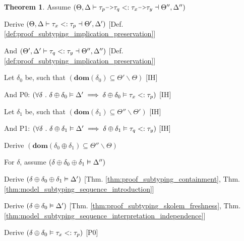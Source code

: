 \documentclass[acmsmall]{acmart}
\theoremstyle{definition}
\newtheorem{theorem}{Theorem}[section]
\begin{document}
\begin{theorem}

  \item \N Assume $(
    \Theta, \Delta \entails 
    \tau_{p} \J{->} \tau_{q} 
    \subtypes 
    \tau_{x} \J{->} \tau_{y}
    \given \Theta'', \Delta'' 
  )$

  \item \I \N Derive $(
    \Theta, \Delta \vdash \tau_{x} <: \tau_{p} \dashv \Theta', \Delta'
  )$ [Def. \ref{def:proof_subtyping_implication_preservation}]

  \item \I \N And $(
    \Theta', \Delta' \vdash \tau_{q} <: \tau_{y} \dashv \Theta'', \Delta'' 
  )$ [Def. \ref{def:proof_subtyping_implication_preservation}]

  \item \I \N Let $\delta_0$ be, such that $(
    \textbf{dom}(\delta_0) \subseteq \Theta' \backslash \Theta
  )$ [IH]
  \item \I \N And P0: $(
    \forall \delta \ .\  
    \delta \oplus \delta_0 \vDash \Delta' 
    \implies 
    \delta \oplus \delta_0 \vDash \tau_x <: \tau_p
  )$ [IH]

  \item \I \N Let $\delta_1$ be, such that $(
    \textbf{dom}(\delta_1) \subseteq \Theta'' \backslash \Theta'
  )$ [IH]
  \item \I \N And P1: $(
    \forall \delta \ .\  
    \delta \oplus \delta_1 \vDash \Delta' 
    \implies 
    \delta \oplus \delta_1 \vDash \tau_q <: \tau_y
  )$ [IH]

  \item \I \N Derive $(
    \textbf{dom}(\delta_0 \oplus \delta_1) \subseteq \Theta'' \backslash \Theta
  )$
  \item \I \N For $\delta$, assume $(\delta \oplus \delta_0 \oplus \delta_1 \vDash \Delta'')$

  \item \I\I \N Derive $(\delta \oplus \delta_0 \oplus \delta_1 \vDash \Delta')$
    [Thm. \ref{thm:proof_subtyping_containment}, Thm. \ref{thm:model_subtyping_sequence_introduction}]
  \item \I\I \N Derive $(\delta \oplus \delta_0 \vDash \Delta')$
    [Thm. \ref{thm:proof_subtyping_skolem_freshness}, Thm. \ref{thm:model_subtyping_sequence_interpretation_independence}]
  \item \I\I \N Derive $(
    \delta \oplus \delta_0 \vDash \tau_x <: \tau_p
  )$ [P0]


\end{theorem}
\end{document}
